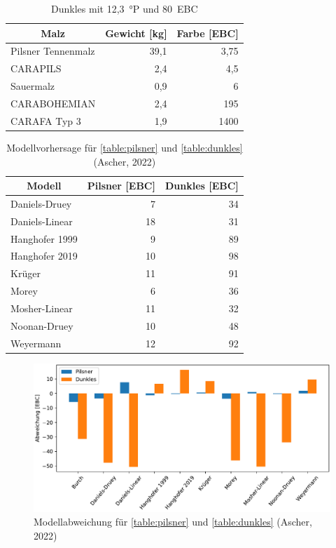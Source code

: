 \documentclass[a4paper,parskip=half]{scrartcl}
\begin{document}
\begin{table}[H]
\centering
\begin{tabular}{lrr}
\toprule
\multicolumn{1}{c}{\textbf{Malz}} & \multicolumn{1}{c}{\textbf{Gewicht [kg]}} & \multicolumn{1}{c}{\textbf{Farbe [EBC]}} \\
\midrule
Pilsner Tennenmalz & 39,1 & 3,75 \\
CARAPILS & 2,4 & 4,5 \\
Sauermalz & 0,9 & 6 \\
CARABOHEMIAN & 2,4 & 195 \\
CARAFA Typ 3 & 1,9 & 1400 \\
\bottomrule
\end{tabular}
\caption{Dunkles mit 12,3~°P und 80~EBC \parencite{KrausWeyermann2022}}
\label{table:dunkles}
\end{table}


\begin{table}[H]
\centering
\begin{tabular}{lrr}
\toprule
\multicolumn{1}{c}{\textbf{Modell}} & \multicolumn{1}{c}{\textbf{Pilsner [EBC]}} & \multicolumn{1}{c}{\textbf{Dunkles [EBC]}} \\
\midrule
Daniels-Druey & 7 & 34 \\
Daniels-Linear & 18 & 31 \\
Hanghofer 1999 & 9 & 89 \\
Hanghofer 2019 & 10 & 98 \\
Krüger & 11 & 91 \\
Morey & 6 & 36 \\
Mosher-Linear & 11 & 32 \\
Noonan-Druey & 10 & 48 \\
Weyermann & 12 & 92 \\
\bottomrule
\end{tabular}
\caption{Modellvorhersage für \autoref{table:pilsner} und \autoref{table:dunkles} (Ascher, 2022)}
\label{table:modelcompare}
\end{table}

\begin{figure}[h]
\centering
\includegraphics[width=14cm]{graph_dev.pdf}
\caption{Modellabweichung für \autoref{table:pilsner} und \autoref{table:dunkles} (Ascher, 2022)}
\label{fig:modelcompare}
\end{figure}
\end{document}
